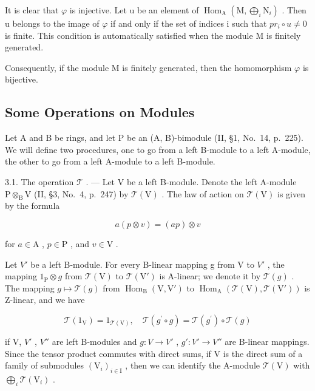 It is clear that \(\varphi\) is injective. Let u be an element of \(\operatorname{Hom}_{\mathrm{A}}(\mathrm{M},\bigoplus_{i}\mathrm{N}_{i})\) . Then u belongs to the image of \(\varphi\) if and only if the set of indices i such that \(pr_{i}\circ u\neq0\) is finite. This condition is automatically satisfied when the module M is finitely generated.

Consequently, if the module M is finitely generated, then the homomorphism \(\varphi\) is bijective.

\subsection{Some Operations on Modules}

Let A and B be rings, and let P be an (A, B)-bimodule (II, §1, No.~14, p.~225). We will define two procedures, one to go from a left B-module to a left A-module, the other to go from a left A-module to a left B-module.

3.1. The operation \(\mathcal{T}\) . --- Let V be a left B-module. Denote the left A-module \(\mathrm{P} \otimes_{\mathrm{B}} \mathrm{V}\) (II, §3, No.~4, p.~247) by \(\mathcal{T}(\mathrm{V})\) . The law of action on \(\mathcal{T}(\mathrm{V})\) is given by the formula

\[
a (p \otimes v) = (a p) \otimes v\tag{1}
\]

for \(a \in \mathrm{A}\) , \(p \in \mathrm{P}\) , and \(v \in \mathrm{V}\) .

Let \(V'\) be a left B-module. For every B-linear mapping g from V to \(V'\) , the mapping \(1_{\mathrm{P}} \otimes g\) from \(\mathcal{T}(\mathrm{V})\) to \(\mathcal{T}(\mathrm{V}')\) is A-linear; we denote it by \(\mathcal{T}(g)\) . The mapping \(g \mapsto \mathcal{T}(g)\) from \(\operatorname{Hom}_{\mathrm{B}}(\mathrm{V}, \mathrm{V}')\) to \(\operatorname{Hom}_{\mathrm{A}}(\mathcal{T}(\mathrm{V}), \mathcal{T}(\mathrm{V}'))\) is Z-linear, and we have

\[
\mathcal {T} (1 _ {\mathrm{V}}) = 1 _ {\mathcal {T} (\mathrm{V})}, \quad \mathcal {T} (g ^ {\prime} \circ g) = \mathcal {T} (g ^ {\prime}) \circ \mathcal {T} (g)\tag{2}
\]

if V, \(V'\) , \(V''\) are left B-modules and \(g : V \to V'\) , \(g' : V' \to V''\) are B-linear mappings. Since the tensor product commutes with direct sums, if V is the direct sum of a family of submodules \((\mathrm{V}_{i})_{i \in \mathrm{I}}\) , then we can identify the A-module \(\mathcal{T}(\mathrm{V})\) with \(\bigoplus_{i} \mathcal{T}(\mathrm{V}_{i})\) .

